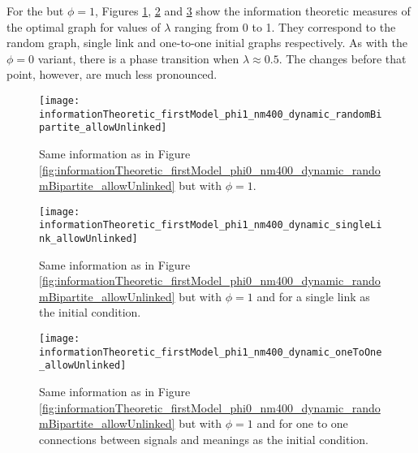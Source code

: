 




For the \firstmodel{} but $\phi=1$, Figures  \ref{fig:informationTheoretic_firstModel_phi1_nm400_dynamic_randomBipartite_allowUnlinked},  \ref{fig:informationTheoretic_firstModel_phi1_nm400_dynamic_singleLink_allowUnlinked} and  \ref{fig:informationTheoretic_firstModel_phi1_nm400_dynamic_oneToOne_allowUnlinked} show the information theoretic measures of the optimal graph for values of $\lambda$ ranging from 0 to 1.
They correspond to the random graph, single link and one-to-one initial graphs respectively.
As with the $\phi=0$ variant, there is a phase transition when $\lambda \approx 0.
5$.
The changes before that point, however, are much less pronounced.

\begin{figure}
  \centering
  \texttt{[image: informationTheoretic\_firstModel\_phi1\_nm400\_dynamic\_randomBipartite\_allowUnlinked]}
  \caption{Same information as in Figure \ref{fig:informationTheoretic_firstModel_phi0_nm400_dynamic_randomBipartite_allowUnlinked} but with $\phi=1$.}
  \label{fig:informationTheoretic_firstModel_phi1_nm400_dynamic_randomBipartite_allowUnlinked}
\end{figure}

\begin{figure}
  \centering
  \texttt{[image: informationTheoretic\_firstModel\_phi1\_nm400\_dynamic\_singleLink\_allowUnlinked]}
  \caption{Same information as in Figure \ref{fig:informationTheoretic_firstModel_phi0_nm400_dynamic_randomBipartite_allowUnlinked} but with $\phi=1$ and for a single link as the initial condition.}
  \label{fig:informationTheoretic_firstModel_phi1_nm400_dynamic_singleLink_allowUnlinked}
\end{figure}

\begin{figure}
  \centering
  \texttt{[image: informationTheoretic\_firstModel\_phi1\_nm400\_dynamic\_oneToOne\_allowUnlinked]}
  \caption{Same information as in Figure \ref{fig:informationTheoretic_firstModel_phi0_nm400_dynamic_randomBipartite_allowUnlinked} but with $\phi=1$ and for one to one connections between signals and meanings as the initial condition.}
  \label{fig:informationTheoretic_firstModel_phi1_nm400_dynamic_oneToOne_allowUnlinked}
\end{figure}

